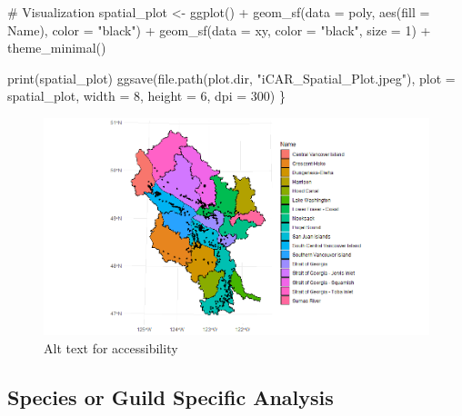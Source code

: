 \documentclass[
  letterpaper,
  DIV=11,
  numbers=noendperiod]{scrreprt}
\newenvironment{Shaded}{\begin{snugshade}}{\end{snugshade}}
\newcommand{\AttributeTok}[1]{\textcolor[rgb]{0.40,0.45,0.13}{#1}}
\newcommand{\CommentTok}[1]{\textcolor[rgb]{0.37,0.37,0.37}{#1}}
\newcommand{\DecValTok}[1]{\textcolor[rgb]{0.68,0.00,0.00}{#1}}
\newcommand{\FunctionTok}[1]{\textcolor[rgb]{0.28,0.35,0.67}{#1}}
\newcommand{\NormalTok}[1]{\textcolor[rgb]{0.00,0.23,0.31}{#1}}
\newcommand{\OtherTok}[1]{\textcolor[rgb]{0.00,0.23,0.31}{#1}}
\newcommand{\SpecialCharTok}[1]{\textcolor[rgb]{0.37,0.37,0.37}{#1}}
\newcommand{\StringTok}[1]{\textcolor[rgb]{0.13,0.47,0.30}{#1}}
\begin{document}
\begin{Shaded}
\begin{Highlighting}[]
  \CommentTok{\# Visualization}
\NormalTok{  spatial\_plot }\OtherTok{\textless{}{-}} \FunctionTok{ggplot}\NormalTok{() }\SpecialCharTok{+}
    \FunctionTok{geom\_sf}\NormalTok{(}\AttributeTok{data =}\NormalTok{ poly, }\FunctionTok{aes}\NormalTok{(}\AttributeTok{fill =}\NormalTok{ Name), }\AttributeTok{color =} \StringTok{"black"}\NormalTok{) }\SpecialCharTok{+}
    \FunctionTok{geom\_sf}\NormalTok{(}\AttributeTok{data =}\NormalTok{ xy, }\AttributeTok{color =} \StringTok{"black"}\NormalTok{, }\AttributeTok{size =} \DecValTok{1}\NormalTok{) }\SpecialCharTok{+}
    \FunctionTok{theme\_minimal}\NormalTok{()}
  
  \FunctionTok{print}\NormalTok{(spatial\_plot)}
  \FunctionTok{ggsave}\NormalTok{(}\FunctionTok{file.path}\NormalTok{(plot.dir, }\StringTok{"iCAR\_Spatial\_Plot.jpeg"}\NormalTok{), }
         \AttributeTok{plot =}\NormalTok{ spatial\_plot, }\AttributeTok{width =} \DecValTok{8}\NormalTok{, }\AttributeTok{height =} \DecValTok{6}\NormalTok{, }\AttributeTok{dpi =} \DecValTok{300}\NormalTok{)}
\NormalTok{\}}
\end{Highlighting}
\end{Shaded}

\begin{figure}[H]

{\centering \includegraphics{Images/WatershedSampleMap.png}

}

\caption{Alt text for accessibility}

\end{figure}%

\subsection{Species or Guild Specific Analysis}\label{3.1.2Analysis}
\end{document}
